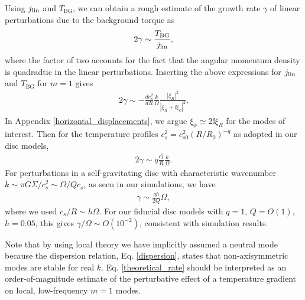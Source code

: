 Using $j_\mathrm{lin}$ and $T_\mathrm{BG}$, we can obtain a rough estimate of
the growth rate $\gamma$ of linear perturbations due to the background
torque as  
\begin{align}
  2\gamma \sim \frac{T_\mathrm{BG}}{j_\mathrm{lin}},
\end{align}
where the factor of two accounts for the fact that the angular momentum
density is quadradtic in the linear perturbations. Inserting the above
expressions for $j_\mathrm{lin}$ and $T_\mathrm{BG}$ for $m=1$ gives
\begin{align}
  2\gamma \sim
  -\frac{dc_s^2}{dR}\frac{k}{\Omega}\frac{|\xi_R|^2}{|\xi_R + \ii
    \xi_\phi|^2}. 
\end{align}
In Appendix \ref{horizontal_displacements}, we argue $\xi_\phi \simeq
2\ii \xi_R$ for the modes of interest. Then 
for the temperature profiles $c_s^2 = c_{s0}^2 (R/R_0)^{-q}$ as
adopted in our disc models,  
\begin{align}
  2\gamma \sim q\frac{c_s^2}{R}\frac{k}{\Omega}. 
\end{align}
For perturbations in a self-gravitating disc with characteristic
wavenumber $k \sim \pi G \Sigma/c_s^2 \sim \Omega/Q c_s$, as seen in
our simulations, we have 
\begin{align}\label{theoretical_rate}
  \gamma \sim \frac{qh}{2Q}\Omega,
\end{align}
where we used $c_s/R\sim h\Omega$. For our fiducial disc models with
$q=1$, $Q=O(1)$, $h=0.05$, this gives $\gamma/\Omega \sim O(10^{-2})$,
consistent with simulation results.  

Note that by using local theory we have implicitly
assumed a neutral mode because the dispersion relation,
Eq. \ref{dispersion}, states that non-axisymmetric modes are
stable for real $k$. Eq. \ref{theoretical_rate} should be interpreted
as an order-of-magnitude estimate of the perturbative effect of a
temperature gradient on local, low-frequency $m=1$ modes.  

